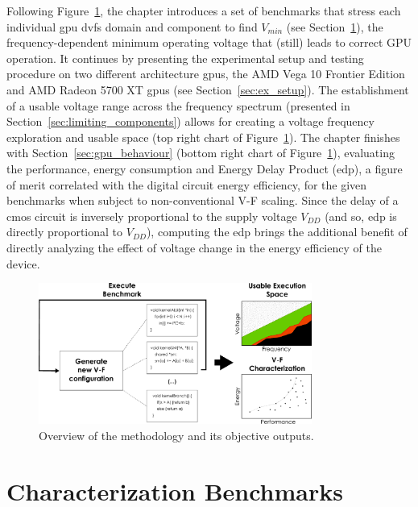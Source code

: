 Following Figure~\ref{fig:gpu_char}, the chapter introduces a set of benchmarks that stress each individual \acrshort{gpu} \acrshort{dvfs} domain and component to find $V_{min}$ (see Section~\ref{sec:char_meth}), the frequency-dependent minimum operating voltage that (still) leads to correct GPU operation. It continues by presenting the experimental setup and testing procedure on two different architecture \acrshort{gpu}s, the AMD Vega 10 Frontier Edition and AMD Radeon 5700 XT \acrshort{gpu}s (see Section~\ref{sec:ex_setup}). The establishment of a usable voltage range across the frequency spectrum (presented in Section~\ref{sec:limiting_components}) allows for creating a voltage frequency exploration and usable space (top right chart of Figure~\ref{fig:gpu_char}). The chapter finishes with Section~\ref{sec:gpu_behaviour} (bottom right chart of Figure~\ref{fig:gpu_char}),  evaluating the performance, energy consumption and Energy Delay Product (\acrshort{edp}), a figure of merit correlated with the digital circuit energy efficiency, for the given benchmarks when subject to non-conventional V-F scaling. 
Since the delay of a \acrshort{cmos} circuit is inversely proportional to the supply voltage $V_{DD}$ (and so, \acrshort{edp} is directly proportional to $V_{DD}$), computing the \acrshort{edp} brings the additional benefit of directly analyzing the effect of voltage change in the energy efficiency of the device.

\begin{figure}[htb]
  \centering
  \includegraphics[width=0.8\textwidth]{Figures/GPU_characterization/gpu_char.pdf}
  \caption{Overview of the methodology and its objective outputs.}
  \label{fig:gpu_char}
\end{figure}




\section{Characterization Benchmarks}
\label{sec:char_meth}

